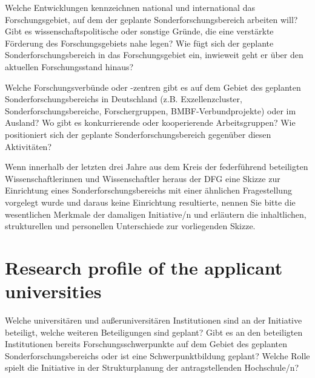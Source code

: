 \begin{erklaerung}
Welche Entwicklungen kennzeichnen national und international das
Forschungsgebiet, auf dem der geplante Sonderforschungsbereich arbeiten
will? Gibt es wissenschaftspolitische oder sonstige Gründe, die eine
verstärkte Förderung des Forschungsgebiets nahe legen? Wie fügt sich der
geplante Sonderforschungsbereich in das Forschungsgebiet ein, inwieweit
geht er über den aktuellen Forschungsstand hinaus?
\end{erklaerung}


\begin{erklaerung}
Welche Forschungsverbünde oder -zentren gibt es auf dem Gebiet des
geplanten Sonderforschungsbereichs in Deutschland (z.B.
Exzellenzcluster, Sonderforschungsbereiche, Forschergruppen,
BMBF-Verbundprojekte) oder im Ausland? Wo gibt es konkurrierende oder
kooperierende Arbeitsgruppen? Wie positioniert sich der geplante
Sonderforschungsbereich gegenüber diesen Aktivitäten?

Wenn innerhalb der letzten drei Jahre aus dem Kreis der
federführend beteiligten Wissenschaftlerinnen und Wissenschaftler heraus
der DFG eine Skizze zur Einrichtung eines Sonderforschungsbereichs mit
einer ähnlichen Fragestellung vorgelegt wurde und daraus keine
Einrichtung resultierte, nennen Sie bitte die wesentlichen Merkmale der
damaligen Initiative/n und erläutern die inhaltlichen, strukturellen und
personellen Unterschiede zur vorliegenden Skizze.
\end{erklaerung}

\section{Research profile of the applicant universities}

\begin{erklaerung}
Welche universitären und außeruniversitären Institutionen sind an
der Initiative beteiligt, welche weiteren Beteiligungen sind geplant?
Gibt es an den beteiligten Institutionen bereits Forschungsschwerpunkte
auf dem Gebiet des geplanten Sonderforschungsbereichs oder ist eine
Schwerpunktbildung geplant? Welche Rolle spielt die Initiative in der
Strukturplanung der antragstellenden Hochschule/n?
\end{erklaerung}


